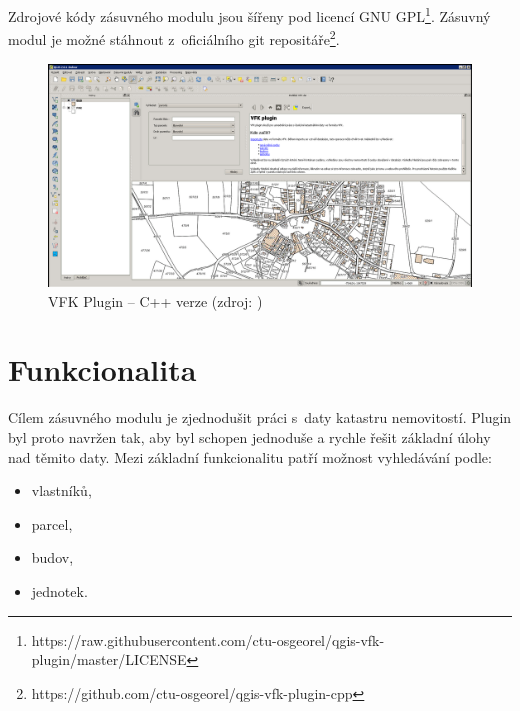 \documentclass[a4paper,12pt,oneside]{book}
\begin{document}
Zdrojové kódy zásuvného modulu jsou šířeny pod licencí GNU GPL\footnote{https://raw.githubusercontent.com/ctu-osgeorel/qgis-vfk-plugin/master/LICENSE}. Zásuvný modul je možné stáhnout z~oficiálního git repositáře\footnote{https://github.com/ctu-osgeorel/qgis-vfk-plugin-cpp}. \cite{cvut_vfkPlugin}

\begin{figure}[htb]
\centering
\includegraphics[width=\textwidth]{images/vfkPlugin-puvodni_okno.png}
\caption[VFK Plugin -- C++ verze]{VFK Plugin -- C++ verze (zdroj: \cite{cvut_vfkPlugin})}
\end{figure}

\newpage
\section{Funkcionalita}
Cílem zásuvného modulu je zjednodušit práci s~daty katastru nemovitostí. Plugin byl proto navržen tak, aby byl schopen jednoduše a rychle řešit základní úlohy nad těmito daty. Mezi základní funkcionalitu patří možnost vyhledávání podle:

\begin{itemize}
 \item vlastníků,
 \item parcel,
 \item budov,
 \item jednotek.
\end{itemize}
\end{document}
